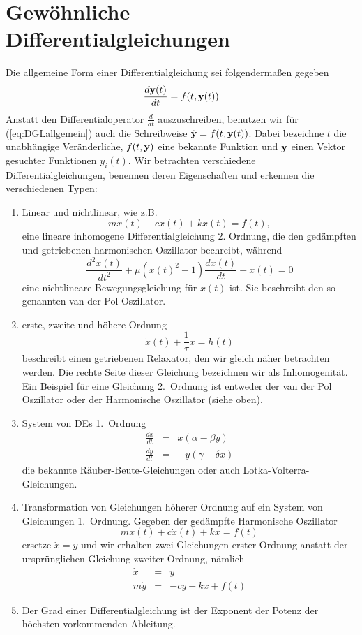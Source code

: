 \chapter{Gewöhnliche Differentialgleichungen}
Die allgemeine Form einer Differentialgleichung sei folgendermaßen gegeben
\begin{equation}
\frac{d\mathbf{y}(t)}{dt}=f(t,\mathbf{y}(t))
  \label{eq:DGLallgemein}
\end{equation}
Anstatt den Differentialoperator $\frac{d}{dt}$ auszuschreiben, benutzen wir
für (\ref{eq:DGLallgemein}) auch die Schreibweise
$\dot{\mathbf{y}}=f(t,\mathbf{y}(t))$.  Dabei bezeichne $t$ die unabhängige
Veränderliche, $f(t,\mathbf{y})$ eine bekannte Funktion und $\mathbf{y}$ einen Vektor
gesuchter Funktionen $y_i(t)$.  Wir betrachten verschiedene
Differentialgleichungen, benennen deren Eigenschaften und erkennen die
verschiedenen Typen:
\begin{enumerate}
	\item Linear und nichtlinear, wie z.B.\
	  \[m\ddot{x}(t)+c\dot{x}(t)+kx(t)=f(t),\]
	  eine lineare inhomogene Differentialgleichung 2. Ordnung,
	  die den gedämpften und getriebenen harmonischen Oszillator bechreibt, während
	\[\frac{d^2x(t)}{dt^2}+\mu(x(t)^2-1)\frac{dx(t)}{dt}+x(t)= 0 \]
	  eine nichtlineare Bewegungsgleichung für $x(t)$ ist. Sie beschreibt den so genannten
	  van der Pol Oszillator.  
	\item erste, zweite und höhere Ordnung 
	  \[ \dot{x}(t)+\frac{1}{\tau}x=h(t)\] 
	  beschreibt einen getriebenen Relaxator, den wir gleich näher
	  betrachten werden. Die rechte Seite dieser Gleichung bezeichnen wir
	  als Inhomogenität.
	  Ein Beispiel für eine Gleichung 2.\ Ordnung ist entweder der
	  van der Pol Oszillator oder der Harmonische Oszillator (siehe
	  oben). 
	\item System von DEs  1.\ Ordnung 
		\begin{eqnarray*}
			\frac{dx}{dt} &=& x(\alpha - \beta y) \\
			\frac{dy}{dt} &=& - y(\gamma - \delta x) 
		\end{eqnarray*}
		die bekannte Räuber-Beute-Gleichungen oder auch Lotka-Volterra-Gleichungen.
	\item Transformation von Gleichungen höherer Ordnung auf ein System von Gleichungen 1.\ Ordnung.
		Gegeben der gedämpfte Harmonische Oszillator
		\[m\ddot{x}(t)+c\dot{x}(t)+kx=f(t)\]
		ersetze $\dot{x} = y$ und wir erhalten zwei Gleichungen erster
		Ordnung anstatt der ursprünglichen Gleichung zweiter Ordnung, nämlich 
		\begin{eqnarray*}
		  \dot{x} &=& y\\
	 	  m\dot{y}&=&-cy-kx+f(t)
	       \end{eqnarray*}
	     \item Der Grad einer Differentialgleichung ist der Exponent der Potenz der höchsten vorkommenden Ableitung.
\end{enumerate}

